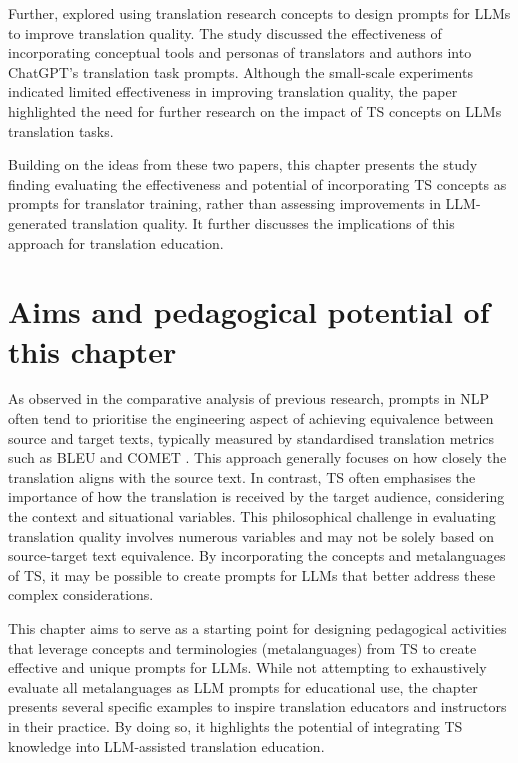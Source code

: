\documentclass[output=paper,colorlinks,citecolor=brown, japanesefont]{langscibook}
\begin{document}
Further, \textcite{he2024promptingchatgpttranslationcomparative} explored using translation research concepts to design prompts for LLMs to improve translation quality. The study discussed the effectiveness of incorporating conceptual tools and personas of translators and authors into ChatGPT's translation task prompts. Although the small-scale experiments indicated limited effectiveness in improving translation quality, the paper highlighted the need for further research on the impact of TS concepts on LLMs translation tasks.

Building on the ideas from these two papers, this chapter presents the study finding evaluating the effectiveness and potential of incorporating TS concepts as prompts for translator training, rather than assessing improvements in LLM-generated translation quality. It further discusses the implications of this approach for translation education.

\section{Aims and pedagogical potential of this chapter}
As observed in the comparative analysis of previous research, prompts in NLP often tend to prioritise the engineering aspect of achieving equivalence between source and target texts, typically measured by standardised translation metrics such as BLEU \citep{Papineni2002} and COMET \citep{Rei2020}. This approach generally focuses on how closely the translation aligns with the source text. In contrast, TS often emphasises the importance of how the translation is received by the target audience, considering the context and situational variables. This philosophical challenge in evaluating translation quality involves numerous variables and may not be solely based on source-target text equivalence. By incorporating the concepts and metalanguages of TS, it may be possible to create prompts for LLMs that better address these complex considerations.

This chapter aims to serve as a starting point for designing pedagogical activities that leverage concepts and terminologies (metalanguages) from TS to create effective and unique prompts for LLMs. While not attempting to exhaustively evaluate all metalanguages as LLM prompts for educational use, the chapter presents several specific examples to inspire translation educators and instructors in their practice. By doing so, it highlights the potential of integrating TS knowledge into LLM-assisted translation education.
\end{document}
